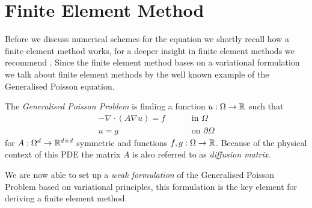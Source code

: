 \section{Finite Element Method}
Before we discuss numerical schemes for the \MA equation we shortly recall how a finite element method works, for a deeper insight in finite element methods we recommend \cite{Braess2003, BS2002}. Since the finite element method bases on a variational formulation we talk about finite element methods by the well known example of the Generalised Poisson equation. 


\begin{definition} \label{def: General Poisson Problem}
The \emph{Generalised Poisson Problem} is finding a function $u:\Omega \rightarrow \mathbb{R}$ such that 
\begin{align}
	-\nabla \cdot (A \nabla u) = f \qquad &\text{ in }\Omega \label{eq: poisson eq} \\
	u = g \qquad &\text{ on } \partial \Omega    \label{eq: poisson bc}
\end{align}
for $ A:\Omega^d \rightarrow \mathbb{R}^{d \times d}$ symmetric and functions $f,g:\Omega \rightarrow \mathbb{R} $. 
Because of the physical context of this PDE the matrix $A$ is also referred to as \emph{diffusion matrix}.
\end{definition}

We are now able to set up a \emph{weak formulation} of the Generalised Poisson Problem based on variational principles, this formulation is the key element for deriving a finite element method.

